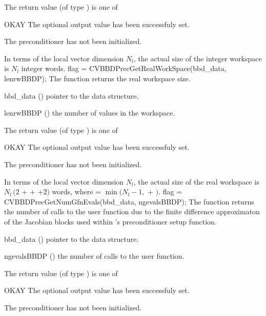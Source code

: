 {
  The return value  (of type ) is one of
  \begin{args}
  \item[OKAY] 
    The optional output value has been successfuly set.
  \item[\Id{BBDP\_NO\_DATA}]
    The {\cvbbdpre} preconditioner has not been initialized.
  \end{args}
}
{
  In terms of the local vector dimension $N_{l}$, the actual size of the integer workspace
  is $N_l$ integer words.
}
{
  flag = CVBBDPrecGetRealWorkSpace(bbd\_data, lenrwBBDP);
}
{
  The function  returns the
  {\cvbbdpre} real workspace size.
}
{
  \begin{args}[lenrwBBDP]
  \item[bbd\_data] ()
    pointer to the {\cvbbdpre} data structure.
  \item[lenrwBBDP] ()
    the number of  values in the {\cvbbdpre} workspace.
  \end{args}
}
{
  The return value  (of type ) is one of
  \begin{args}
  \item[OKAY] 
    The optional output value has been successfuly set.
  \item[\Id{BBDP\_NO\_DATA}]
    The {\cvbbdpre} preconditioner has not been initialized.
  \end{args}
}
{
  In terms of the local vector dimension $N_l$, the actual size of the real workspace is
  $N_l \,(2$  $+$  $+$  $+2)$  words,
  where  = $\min ( N_l - 1 ,$  $+$ $)$.
}
{
  flag = CVBBDPrecGetNumGfnEvals(bbd\_data, ngevalsBBDP);
}
{
  The function  returns the
  number of calls to the user  function due to the 
  finite difference approximaton of the Jacobian blocks used within
  {\cvbbdpre}'s preconditioner setup function.
}
{
  \begin{args}[ngevalsBBDP]
  \item[bbd\_data] ()
    pointer to the {\cvbbdpre} data structure.
  \item[ngevalsBBDP] ()
    the number of calls to the user  function.
  \end{args}
}
{
  The return value  (of type ) is one of
  \begin{args}
  \item[OKAY] 
    The optional output value has been successfuly set.
  \item[\Id{BBDP\_NO\_DATA}]
    The {\cvbbdpre} preconditioner has not been initialized.
  \end{args}
}
{}

